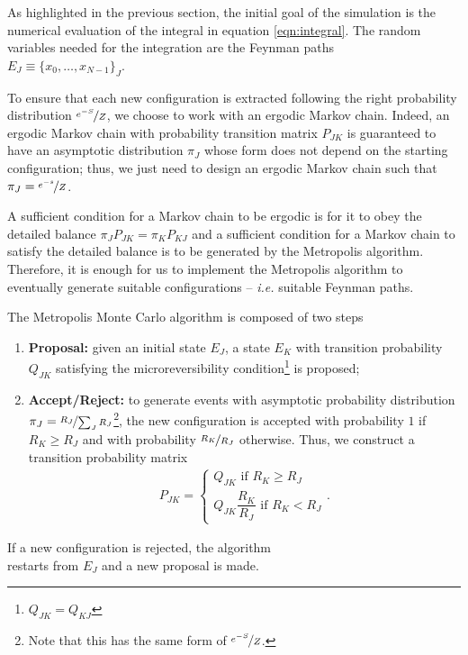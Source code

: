 As highlighted in the previous section, the initial goal of the simulation is the numerical evaluation
of the integral in equation \ref{eqn:integral}.
The random variables needed for the integration are the Feynman paths\\ $E_{J}\equiv\{x_{0},\dots,x_{N-1}\}_{J}$.

To ensure that each new configuration is extracted following the right probability distribution
$\nicefrac{e^{-S}}{Z}$, we choose to work with an ergodic Markov chain.
Indeed, an ergodic Markov chain with probability transition matrix $P_{JK}$ is guaranteed to have
an asymptotic distribution $\pi_{J}$ whose form does not depend on the starting configuration; thus, we just need to design an ergodic Markov chain such that $\pi_{J}=\nicefrac{e^{-s}}{Z}$.



A sufficient condition for a Markov chain to be ergodic is for it to obey the detailed balance $\pi_{J}P_{JK}=\pi_{K}P_{KJ}$ and a sufficient condition for a Markov chain to satisfy the detailed balance is to be generated by the Metropolis algorithm. Therefore, it is enough for us to implement the Metropolis algorithm to eventually generate suitable configurations -- \textit{i.e.} suitable Feynman paths.

The Metropolis Monte Carlo algorithm is composed of two steps

\begin{enumerate}
  \item \textbf{Proposal:} given an initial state $E_{J}$, a state $E_{K}$ with transition probability $Q_{JK}$ satisfying
        the microreversibility condition\footnote{$Q_{JK}=Q_{KJ}$} is proposed;
  \item \textbf{Accept/Reject:} to generate events with asymptotic probability distribution $\pi_{J} = \nicefrac{R_{J}}{\sum_{J}R_{J}}$\footnote{Note that this has the same form of $\nicefrac{e^{-S}}{Z}$.},
        the new configuration is accepted with probability $1$ if $R_{K}\ge R_{J}$ and with probability
        $\nicefrac{R_K}{R_J}$ otherwise. Thus, we construct a transition probability matrix
      \begin{align}
          P_{JK}=
          \begin{cases}
            Q_{JK} \text{ if } R_{K}\ge R_{J}\\
            Q_{JK}\dfrac{R_{K}}{R_{J}} \text{ if } R_{K}<R_{J}
          \end{cases}.
        \end{align}
\end{enumerate}
If a new configuration is rejected, the algorithm \\restarts from $E_{J}$ and a new proposal is made.


